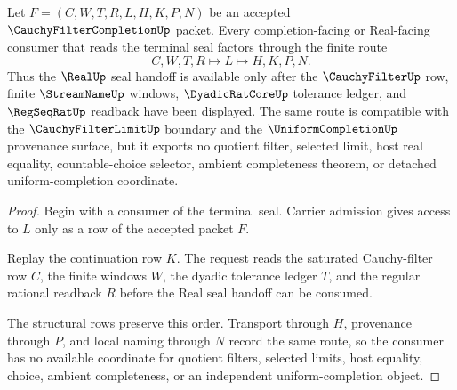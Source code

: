 \begin{theorem}
\label{thm:cauchy-filter-completion-real-seal-handoff}
Let $F=(C,W,T,R,L,H,K,P,N)$ be an accepted $\CauchyFilterCompletionUp$ packet. Every completion-facing or Real-facing consumer that reads the terminal seal factors through the finite route
$$
C,W,T,R \longmapsto L \longmapsto H,K,P,N .
$$
Thus the $\RealUp$ seal handoff is available only after the $\CauchyFilterUp$ row, finite $\StreamNameUp$ windows, $\DyadicRatCoreUp$ tolerance ledger, and $\RegSeqRatUp$ readback have been displayed. The same route is compatible with the $\CauchyFilterLimitUp$ boundary and the $\UniformCompletionUp$ provenance surface, but it exports no quotient filter, selected limit, host real equality, countable-choice selector, ambient completeness theorem, or detached uniform-completion coordinate.
\end{theorem}
\begin{proof}
Begin with a consumer of the terminal seal. Carrier admission gives access to $L$ only as a row of the accepted packet $F$.

Replay the continuation row $K$. The request reads the saturated Cauchy-filter row $C$, the finite windows $W$, the dyadic tolerance ledger $T$, and the regular rational readback $R$ before the Real seal handoff can be consumed.

The structural rows preserve this order. Transport through $H$, provenance through $P$, and local naming through $N$ record the same route, so the consumer has no available coordinate for quotient filters, selected limits, host equality, choice, ambient completeness, or an independent uniform-completion object.
\end{proof}

